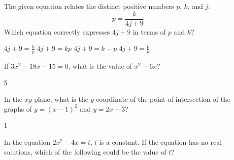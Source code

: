 \question[1]
The given equation relates the distinct positive numbers $p$, $k$, and $j$:
\[
  p=\frac{k}{4j+9}
\]
Which equation correctly expresses $4j+9$ in terms of $p$ and $k$?
\begin{choices}
  \CorrectChoice $4j+9=\frac{k}{p}$
  \choice $4j+9=kp$
  \choice $4j+9=k-p$
  \choice $4j+9=\frac{p}{k}$
\end{choices}



\newpage



\question[1]
If $3x^{2}-18x-15=0$, what is the value of $x^{2}-6x$?
\begin{solution}
5
\end{solution}

\question[1]
In the $xy$-plane, what is the $y$-coordinate of the point of intersection of the graphs of $y=(x-1)^{2}$ and $y=2x-3$?
\begin{solution}
1
\end{solution}

\question[1]
In the equation $2x^{2}-4x=t$, $t$ is a constant. If the equation has no real solutions, which of the following could be the value of $t$?
\begin{choices}
\end{choices}

